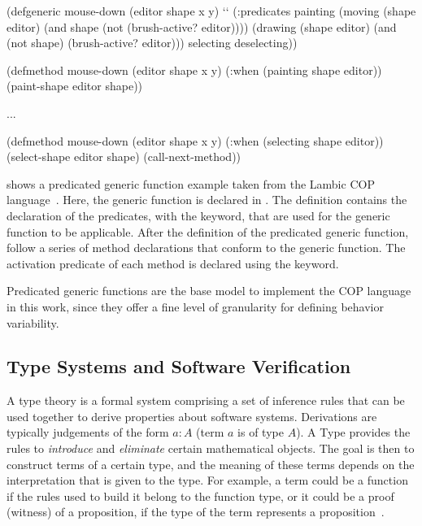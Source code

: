 \begin{scala}[label={lst:lambic-example}, caption={Predicated generic functions example in Lambic, taken from~\citet{vallejos10pred}.}]
(defgeneric mouse-down (editor shape x y) `\label{ln:lambic-example.declaration}`
  (:predicates
    painting
    (moving (shape editor) (and shape (not (brush-active? editor))))
    (drawing (shape editor) (and (not shape) (brush-active? editor)))
    selecting
    deselecting))

(defmethod mouse-down (editor shape x y)
  (:when (painting shape editor))
  (paint-shape editor shape))

...

(defmethod mouse-down (editor shape x y)
  (:when (selecting shape editor))
  (select-shape editor shape)
  (call-next-method))
\end{scala}

 shows a predicated generic function example taken from the Lambic 
\ac{COP} language~\cite{vallejos10pred}. Here, the  generic function is declared 
in . The definition contains the declaration of the predicates, with 
the  keyword, that are used for the generic function to be applicable. After the 
definition of the predicated generic function, follow a series of method declarations that conform to the 
generic function. The activation predicate of each method is declared using the  keyword.

Predicated generic functions are the base model to implement the \ac{COP} language in this work, 
since they offer a fine level of granularity for defining behavior variability.


\subsection{Type Systems and Software Verification}
\label{sec:types}

A type theory is a formal system comprising a set of inference rules that can be used together to derive 
properties about software systems. Derivations are typically judgements of the form $a : A$ (term $a$ 
is of type $A$). A Type provides the rules to \emph{introduce} and \emph{eliminate} certain 
mathematical objects. The goal is then to construct terms of a certain type, and the meaning of these 
terms depends on the interpretation that is given to the type. For example, a term could be a function if 
the rules used to build it belong to the function type, or it could be a proof (witness) of a proposition, if 
the type of the term represents a proposition~\cite{rijke22}.

